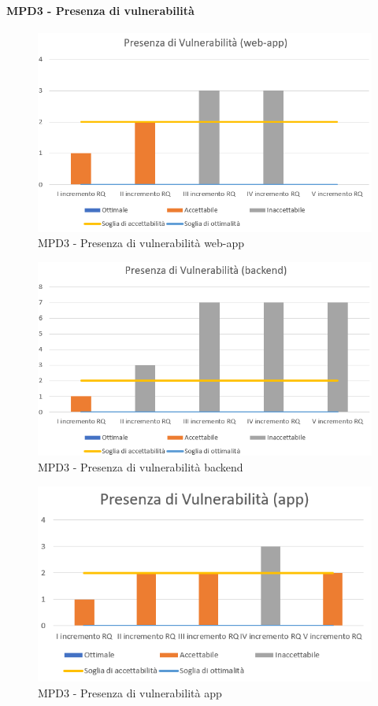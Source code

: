   \clearpage
  \paragraph{MPD3 - Presenza di vulnerabilità}
  \begin{figure}[h!]
    \centering
      \includegraphics[scale=1]{Immagini/Vuln WA.PNG}
    \caption{MPD3 - Presenza di vulnerabilità web-app}
  \end{figure}

  \begin{figure}[h!]
    \centering
      \includegraphics[scale=1]{Immagini/Vuln BE.PNG}
    \caption{MPD3 - Presenza di vulnerabilità backend}
  \end{figure}

  \begin{figure}[h!]
    \centering
      \includegraphics[scale=1]{Immagini/Vuln APP.PNG}
    \caption{MPD3 - Presenza di vulnerabilità app}
  \end{figure}



